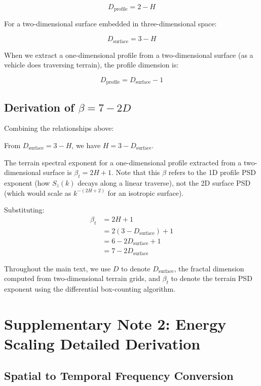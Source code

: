 \documentclass[11pt,letterpaper]{article}
\begin{document}
\begin{equation}
D_{\text{profile}} = 2 - H
\end{equation}

For a two-dimensional surface embedded in three-dimensional space:

\begin{equation}
D_{\text{surface}} = 3 - H
\end{equation}

When we extract a one-dimensional profile from a two-dimensional surface (as a vehicle does traversing terrain), the profile dimension is:

\begin{equation}
D_{\text{profile}} = D_{\text{surface}} - 1
\end{equation}

\subsection{Derivation of $\beta = 7-2D$}

Combining the relationships above:

From $D_{\text{surface}} = 3 - H$, we have $H = 3 - D_{\text{surface}}$.

The terrain spectral exponent for a one-dimensional profile extracted from a two-dimensional surface is $\beta_t = 2H + 1$. Note that this $\beta$ refers to the 1D profile PSD exponent (how $S_z(k)$ decays along a linear traverse), not the 2D surface PSD (which would scale as $k^{-(2H+2)}$ for an isotropic surface).

Substituting:
\begin{align}
\beta_t &= 2H + 1 \\
&= 2(3 - D_{\text{surface}}) + 1 \\
&= 6 - 2D_{\text{surface}} + 1 \\
&= 7 - 2D_{\text{surface}}
\end{align}

Throughout the main text, we use $D$ to denote $D_{\text{surface}}$, the fractal dimension computed from two-dimensional terrain grids, and $\beta_t$ to denote the terrain PSD exponent using the differential box-counting algorithm.

\section{Supplementary Note 2: Energy Scaling Detailed Derivation}

\subsection{Spatial to Temporal Frequency Conversion}
\end{document}
